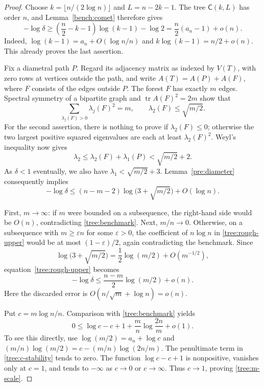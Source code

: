 \documentclass[11pt,a4paper]{article}
\numberwithin{equation}{section}
\theoremstyle{definition}
\theoremstyle{remark}
\newcommand{\Comet}{\mathsf{C}}
\begin{document}
\begin{proof}
Choose $k=\lfloor n/(2\log n)\rfloor$ and $L=n-2k-1$.
The tree $\Comet(k,L)$ has order $n$, and Lemma~\ref{bench:comet}
therefore gives
\begin{equation}\label{tree:benchmark}
 -\log\delta\geq
 \left(\frac n2-k-1\right)\log(k-1)-\log2
 =\frac n2(a_n-1)+o(n).
\end{equation}
Indeed, $\log(k-1)=a_n+O(\log n/n)$ and
$k\log(k-1)=n/2+o(n)$. This already proves the last assertion.

Fix a diametral path $P$. Regard its adjacency matrix as indexed by
$V(T)$, with zero rows at vertices outside the path, and write
$A(T)=A(P)+A(F)$, where $F$ consists of the edges outside $P$.
The forest $F$ has exactly $m$ edges. Spectral symmetry of a bipartite
graph and $\operatorname{tr}A(F)^2=2m$ show that
\[
 \sum_{\lambda_j(F)>0}\lambda_j(F)^2=m,
 \qquad \lambda_2(F)\leq\sqrt{m/2}.
\]
For the second assertion, there is nothing to prove if
$\lambda_2(F)\leq0$; otherwise the two largest positive squared
eigenvalues are each at least $\lambda_2(F)^2$. Weyl's inequality now
gives
\[
 \lambda_2\leq\lambda_2(F)+\lambda_1(P)<\sqrt{m/2}+2.
\]
As $\delta<1$ eventually, we also have
$\lambda_1<\sqrt{m/2}+3$. Lemma~\ref{pre:diameter} consequently implies
\begin{equation}\label{tree:rough-upper}
 -\log\delta\leq
 (n-m-2)\log\bigl(3+\sqrt{m/2}\bigr)+O(\log n).
\end{equation}

First, $m\to\infty$: if $m$ were bounded on a subsequence, the
right-hand side would be $O(n)$, contradicting
\eqref{tree:benchmark}. Next, $m/n\to0$. Otherwise, on a subsequence
with $m\geq\varepsilon n$ for some $\varepsilon>0$, the coefficient of
$n\log n$ in \eqref{tree:rough-upper} would be at most
$(1-\varepsilon)/2$, again contradicting the benchmark. Since
\[
 \log\bigl(3+\sqrt{m/2}\bigr)
 =\frac12\log(m/2)+O(m^{-1/2}),
\]
equation~\eqref{tree:rough-upper} becomes
\[
 -\log\delta\leq\frac{n-m}{2}\log(m/2)+o(n).
\]
Here the discarded error is $O(n/\sqrt m+\log n)=o(n)$.

Put $c=m\log n/n$. Comparison with \eqref{tree:benchmark} yields
\begin{equation}\label{tree:c-stability}
 0\leq\log c-c+1+\frac mn\log\frac{2n}{m}+o(1).
\end{equation}
To see this directly, use $\log(m/2)=a_n+\log c$ and
$(m/n)\log(m/2)=c-(m/n)\log(2n/m)$. The penultimate term in
\eqref{tree:c-stability} tends to zero. The function
$\log c-c+1$ is nonpositive, vanishes only at $c=1$, and tends to
$-\infty$ as $c\to0$ or $c\to\infty$. Thus $c\to1$, proving
\eqref{tree:m-scale}.


\end{proof}
\end{document}

